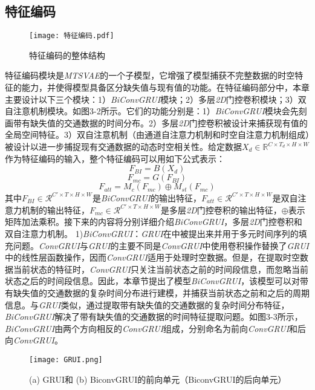 \subsection{特征编码}
\begin{figure*}[htbp]
\vspace{-0.2cm} 
\centerline{\texttt{[image: 特征编码.pdf]}}
\caption{特征编码的整体结构}
\label{fig}
\vspace{-0.2cm}  
\end{figure*}
特征编码模块是\textit{MTSVAE}的一个子模型，它增强了模型捕获不完整数据的时空特征的能力，并使得模型具备区分缺失值与现有值的功能。在特征编码部分中，本章主要设计以下三个模块：1）\textit{BiConvGRUI}模块；2）多层\textit{2D}门控卷积模块；3）双自注意机制模块。如图3-2所示。它们的功能分别是：1）\textit{BiConvGRUI}模块会先刻画带有缺失值的交通数据的时间分布。2）多层\textit{2D}门控卷积被设计来捕获现有值的全局空间特征。3）双自注意机制（由通道自注意力机制和时空自注意力机制组成）被设计以进一步捕捉现有交通数据的动态时空相关性。给定数据$X_d \in \mathbb{R}^{C\times T_d\times H\times W}$作为特征编码的输入，整个特征编码可以用如下公式表示：
\begin{equation}
F_{BI}=B(X_d)
\end{equation}
\begin{equation}
F_{mc}=G(F_{BI})
\end{equation}     
\begin{equation}
F_{att}=M_c(F_{mc})\oplus M_{st}(F_{mc}) 
\end{equation}
其中$F_{BI}\in \mathcal{R}^{C'\times T\times H\times W}$是\textit{BiConvGRUI}的输出特征，$F_{att}\in \mathcal{R}^{C'\times T\times H\times W}$是双自注意力机制的输出特征，$F_{mc}\in \mathcal{R}^{C'\times T\times H\times W}$是多层\textit{2D}门控卷积的输出特征，$\oplus$表示矩阵加法乘积。接下来的内容将分别详细介绍\textit{BiConvGRUI}，多层\textit{2D}门控卷积和双自注意力机制。
1)\textit{BiConvGRUI}：\textit{GRUI}在\cite{14}中被提出来并用于多元时间序列的填充问题。\textit{ConvGRUI}\cite{12}与\textit{GRUI}的主要不同是\textit{ConvGRUI}中使用卷积操作替换了\textit{GRUI}中的线性层函数操作，因而\textit{ConvGRUI}适用于处理时空数据。但是，在提取时空数据当前状态的特征时，\textit{ConvGRUI}只关注当前状态之前的时间段信息，而忽略当前状态之后的时间段信息。因此，本章节提出了模型\textit{BiConvGRUI}，该模型可以对带有缺失值的交通数据的复杂时间分布进行建模，并捕获当前状态之前和之后的周期信息。与\textit{GRUI}类似，通过提取带有缺失值的交通数据的复杂时间分布特征，\textit{BiConvGRUI}解决了带有缺失值的交通数据的时间特征提取问题。如图3-3所示，\textit{BiConvGRUI}由两个方向相反的\textit{ConvGRUI}组成，分别命名为前向\textit{ConvGRUI}和后向\textit{ConvGRUI}。 
\begin{figure}[htbp]
\vspace{-0.2cm}
\centerline{\texttt{[image: GRUI.png]}}
\caption{(a) GRUI和 (b) BiconvGRUI的前向单元（BiconvGRUI的后向单元）}
\label{fig}
\vspace{-0.2cm}
\end{figure}  
 
